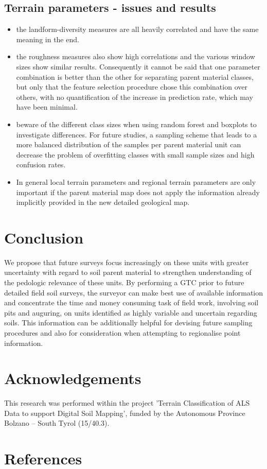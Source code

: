 \documentclass[preprint,12pt,authoryear]{elsarticle}
\begin{document}
\subsection{Terrain parameters - issues and results}
\begin{itemize}
\item the landform-diversity measures are all heavily correlated and have the same meaning in the end.
\item the roughness measures also show high correlations and the various window sizes show similar results. Consequently it cannot be said that one parameter combination is better than the other for separating parent material classes, but only that the feature selection procedure chose this combination over others, with no quantification of the increase in prediction rate, which may have been minimal.
\item beware of the different class sizes when using random forest and boxplots to investigate differences. For future studies, a sampling scheme that leads to a more balanced distribution of the samples per parent material unit can decrease the problem of overfitting classes with small sample sizes and high confusion rates.
\item In general local terrain parameters and regional terrain parameters are only important if the parent material map does not apply the information already implicitly provided in the new detailed geological map.
\end{itemize}

\section{Conclusion}
We propose that future surveys focus increasingly on these units with greater uncertainty with regard to soil parent material to strengthen understanding of the pedologic relevance of these units. By performing a GTC prior to future detailed field soil surveys, the surveyor can make best use of available information and concentrate the time and money consuming task of field work, involving soil pits and auguring, on units identified as highly variable and uncertain regarding soils. This information can be additionally helpful for devising future sampling procedures and also for consideration when attempting to regionalise point information.

\section*{Acknowledgements} This research was performed within the project 'Terrain Classification of ALS Data to support Digital Soil Mapping', funded by the Autonomous Province Bolzano -- South Tyrol (15/40.3).

\section*{References}

\end{document}

